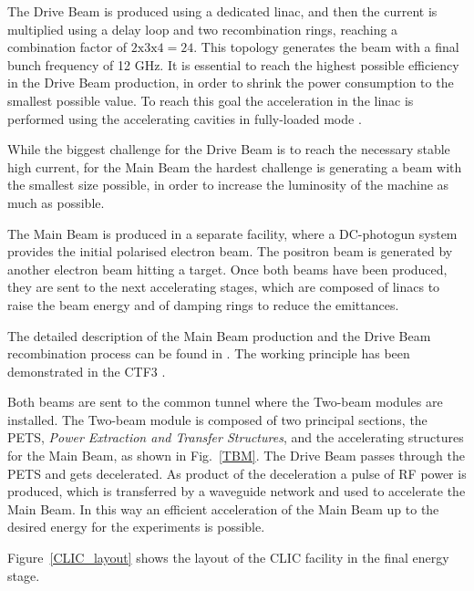 The Drive Beam is produced using a dedicated linac, and then the current is multiplied using a delay loop and two recombination rings, reaching a combination factor of $2\text{x}3\text{x}4=24$. This topology generates the beam with a final bunch frequency of 12 GHz. It is essential to reach the highest possible efficiency in the Drive Beam production, in order to shrink the power consumption to the smallest possible value. To reach this goal the acceleration in the linac is performed using the accelerating cavities in fully-loaded mode \cite{Corsini:791372}.

While the biggest challenge for the Drive Beam is to reach the necessary stable high current, for the Main Beam the hardest challenge is generating a beam with the smallest size possible, in order to increase the luminosity of the machine as much as possible.

The Main Beam is produced in a separate facility, where a DC-photogun system provides the initial polarised electron beam. The positron beam is generated by another electron beam hitting a target. Once both beams have been produced, they are sent to the next accelerating stages, which are composed of linacs to raise the beam energy and of damping rings to reduce the emittances. 

The detailed description of the Main Beam production and the Drive Beam recombination process can be found in \cite{CLIC:cdr}. The working principle has been demonstrated in the CTF3 \cite{CTF:drive_beam}. 

Both beams are sent to the common tunnel where the Two-beam modules are installed. The Two-beam module is composed of two principal sections, the PETS, \textit{Power Extraction and Transfer Structures}, and the accelerating structures for the Main Beam, as shown in Fig.~\ref{TBM}. The Drive Beam passes through the PETS and gets decelerated. As product of the deceleration a pulse of RF power is produced, which is transferred by a waveguide network and used to accelerate the Main Beam. In this way  an efficient acceleration of the Main Beam up to the desired energy for the experiments is possible.

Figure~\ref{CLIC_layout} shows the layout of the CLIC facility in the final energy stage.

